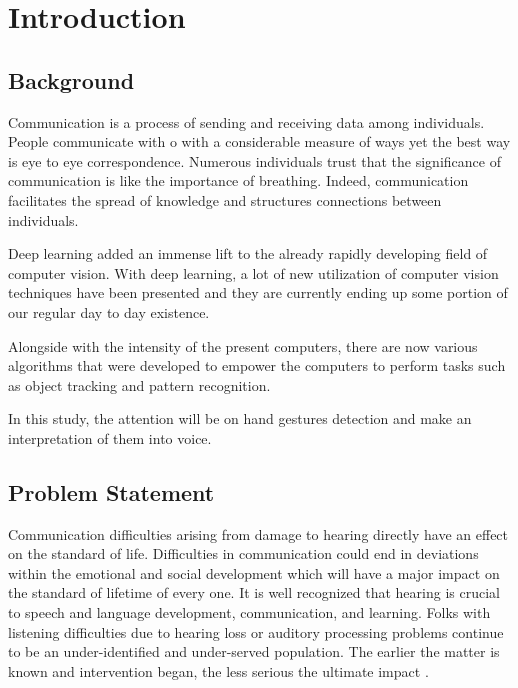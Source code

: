 \documentclass[12pt]{report}
\begin{document}
    \setcounter{page}{2}                    
    \tableofcontents{}
    \listoffigures
    \listoftables
    \newpage

    \chapter{Introduction} 

        \section{Background}
                Communication is a process of sending and receiving data among individuals. 
                People communicate with o with a considerable measure of ways yet the best way is eye to eye correspondence.
                Numerous individuals trust that the significance of communication 
                is like the importance of breathing. Indeed, communication facilitates the spread of knowledge
                and structures connections between individuals.
            
                Deep learning added an immense lift to the already rapidly developing field of computer vision.
                With deep learning, a lot of new utilization of computer vision techniques have been presented
                and they are currently ending up some portion of our regular day to day existence.
            
                Alongside with the intensity of the present computers, there are now various algorithms that were developed 
                to empower the computers to perform tasks such as object tracking and pattern recognition. 
                
                In this study, the attention will be on hand gestures detection and make an interpretation of them into voice.

        \section{Problem Statement}
                Communication difficulties arising from damage to hearing
                directly have an effect on the standard of life. Difficulties in communication could
                end in deviations within the emotional and social development which
                will have a major impact on the standard of lifetime of every one.
                It is well recognized that hearing is crucial to speech and language development, communication, and learning.
                Folks with listening difficulties due to hearing loss or auditory processing problems
                continue to be an under-identified and under-served population. The
                earlier the matter is known and intervention began, the less
                serious the ultimate impact \cite{AFrajtag12017}.
\end{document}
